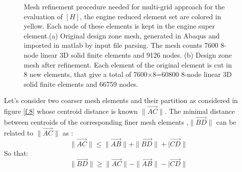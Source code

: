   \begin{figure}[hbt!]
  \centering
       \caption{Mesh refinement procedure needed for multi-grid approach for the evaluation of $\left[H\right]$, the engine reduced element set are colored in yellow. Each node of these elements is kept in the engine super element.(a) Original design zone mesh, generated in Abaqus and imported in matlab by input file parsing. The mesh counts 7600 8-node linear 3D solid finite elements and 9126 nodes. (b) Design zone mesh after refinement. Each element of the original element is cut in 8 new elements, that give a total of 7600$\times$8=60800 8-node linear 3D solid finite elements and  66759 nodes. }
       \label{f.7}
     \end{figure}
 Let's consider two coarser mesh elements and their partition as considered in figure \ref{f.8} whose centroid distance is known $\|\vec{AC}\|$. The minimal distance between centroids of the corresponding finer mesh elements ,$\|\vec{BD}\|$ can be related to $\|\vec{AC}\|$ as :
  \begin{equation}
  \label{e.12}
  \|\vec{AC}\|\leq\|\vec{AB}\|+\|\vec{BD}\|+|\vec{CD}\|
  \end{equation}
 So that:
  \begin{equation}
  \label{e.13}
  \|\vec{BD}\|\geq \|\vec{AC}\|-\|\vec{AB}\|-|\vec{CD}\|
  \end{equation}
